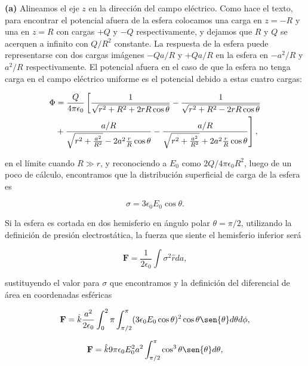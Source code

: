 \documentclass[a4paper,10pt]{article}
\numberwithin{equation}{section}
\newcommand{\zerodel}{.\kern-\nulldelimiterspace}
\begin{document}
\vspace{.3cm}

\textbf{(a)} Alineamos el eje $z$ en la dirección del campo eléctrico. Como hace 
el texto, para encontrar el potencial afuera de la esfera colocamos una carga en 
$z = -R$ y una en $z = R$ con cargas $+Q$ y $-Q$ respectivamente, y dejamos que 
$R$ y $Q$ se acerquen a infinito con $Q/R^2$ constante. La respuesta de la esfera 
puede representarse con dos cargas imágenes $-Qa/R$ y $+Qa/R$ en la esfera en 
$-a^2/R$ y $a^2/R$ respectivamente. El potencial afuera en el caso de que la 
esfera no tenga carga en el campo eléctrico uniforme es el potencial debido a 
estas cuatro cargas:

\begin{align*}
 \Phi &= \frac{Q}{4\pi\epsilon_0}\left[ \frac{1}{\sqrt{r^2 + R^2 + 2rR\cos{\theta}}} 
 - \frac{1}{\sqrt{r^2 + R^2 - 2rR\cos{\theta}}}\right\zerodel \\
 &+\left\zerodel \frac{a/R}{\sqrt{r^2+\frac{a^2}{R^2}}-2a^2\frac{r}{R}\cos{\theta}}
 - \frac{a/R}{\sqrt{r^2+\frac{a^2}{R^2}}+2a^2\frac{r}{R}\cos{\theta}}\right],
\end{align*}

en el límite cuando $R\gg r$, y reconociendo a $E_0$ como $2Q/4\pi\epsilon_0 R^2$, 
luego de un poco de cálculo, encontramos que la distribución superficial de carga 
de la esfera es 

\begin{equation}
 \sigma = 3\epsilon_0 E_0 \cos{\theta}.
\end{equation}

Si la esfera es cortada en dos hemisferio en ángulo polar $\theta = \pi/2$, utilizando 
la definición de presión electrostática, la fuerza que siente el hemisferio inferior 
será 

\begin{equation}
 \mathbf{F} = \frac{1}{2\epsilon_0}\int \sigma^2 \hat{r} da,
\end{equation}

sustituyendo el valor para $\sigma$ que encontramos y la definición del diferencial 
de área en coordenadas esféricas

\begin{equation}
 \mathbf{F} = \hat{k} \frac{a^2}{2\epsilon_0}\int_0^2\pi \int_{\pi/2}^\pi 
 (3\epsilon_0 E_0 \cos{\theta})^2\cos{\theta}\sen{\theta}d\theta d\phi,
\end{equation}

\begin{equation}
 \mathbf{F} = \hat{k} 9\pi \epsilon_0 E_0^2 a^2 \int_{\pi/2}^\pi \cos^3{\theta}
 \sen{\theta} d\theta,
\end{equation}
\end{document}
